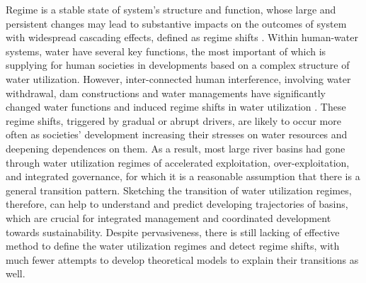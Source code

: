 \documentclass[9pt, twocolumn, twoside, lineno]{pnas-new}
\begin{document}
Regime is a stable state of system’s structure and function, whose large and persistent changes may lead to substantive impacts on the outcomes of system with widespread cascading effects, defined as regime shifts \cite{rochaCascadingRegimeShifts2018a, schefferCatastrophicRegimeShifts2003a, schefferCatastrophicShiftsEcosystems2001}.
Within human-water systems, water have several key functions, the most important of which is supplying for human societies in developments based on a complex structure of water utilization. 
However, inter-connected human interference, involving water withdrawal, dam constructions and water managements have significantly changed water functions and induced regime shifts in water utilization
\cite{falkenmarkUnderstandingWaterResilience2019}.
These regime shifts, triggered by gradual or abrupt drivers, are likely to occur more often as societies' development increasing their stresses on water resources and deepening dependences on them.
As a result, most large river basins had gone through water utilization regimes of accelerated exploitation, over-exploitation, and integrated governance, for which it is a reasonable assumption that there is a general transition pattern. 
Sketching the transition of water utilization regimes, therefore, can help to understand and predict developing trajectories of basins, which are crucial for integrated management and coordinated development towards sustainability.
Despite pervasiveness, there is still lacking of effective method to define the water utilization regimes and detect regime shifts, with much fewer attempts to develop theoretical models to explain their transitions as well. 
\end{document}
